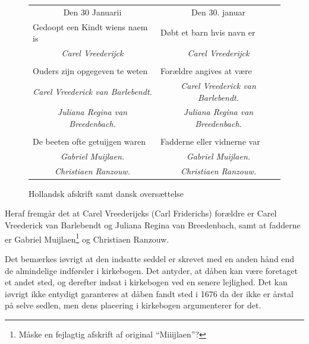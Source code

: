 \documentclass[
	a4paper,
	12pt,
	final
]{memoir}
\begin{document}
\begin{figure}[H]%
	\centerfloat%
	\colorbox{tablebkg}{%
	\begin{tabular}{p{} | p{}}
		\multicolumn{1}{c|}{Den 30 Januarii} & \multicolumn{1}{c}{Den 30. januar} \\
		Gedoopt een Kindt wiens naem is & Døbt et barn hvis navn er \\
		\multicolumn{1}{c|}{\larger \emph{Carel Vreederĳck}} & \multicolumn{1}{c}{\larger \emph{Carel Vreederĳck}} \\ %
		& \\
		Ouders zĳn opgegeven te weten & Forældre angives at være \\
		\multicolumn{1}{c|}{\emph{Carel Vreederick van Barlebendt.}} & \multicolumn{1}{c}{\emph{Carel Vreederick van Barlebendt.}} \\
		\multicolumn{1}{c|}{\emph{Juliana Regina van Breedenbach.}} & \multicolumn{1}{c}{\emph{Juliana Regina van Breedenbach.}} \\
		& \\
		De beeten ofte getuĳgen waren & Fadderne eller vidnerne var \\
		\multicolumn{1}{c|}{\emph{Gabriel Muĳlaen.}} & \multicolumn{1}{c}{\emph{Gabriel Muĳlaen.}} \\
		\multicolumn{1}{c|}{\emph{Christiaen Ranzouw.}} & \multicolumn{1}{c}{\emph{Christiaen Ranzouw.}} \\
	\end{tabular}}%
	\caption{Hollandsk afskrift samt dansk oversættelse}%
\end{figure}%


Heraf fremgår det at Carel Vreederijcks (Carl Friderichs) forældre er Carel Vreederick van Barlebendt og Juliana Regina van Breedenbach, samt at fadderne er Gabriel Muĳlaen\footnote{Måske en fejlagtig afskrift af original \enquote{Miiĳlaen}?} og Christiaen Ranzouw.

Det bemærkes iøvrigt at den indsatte seddel er skrevet med en anden hånd end de almindelige indførsler i kirkebogen. Det antyder, at dåben kan være foretaget et andet sted, og derefter indsat i kirkebogen ved en senere lejlighed. Det kan iøvrigt ikke entydigt garanteres at dåben fandt sted i 1676 da der ikke er årstal på selve sedlen, men dens placering i kirkebogen argumenterer for det.

\end{document}
